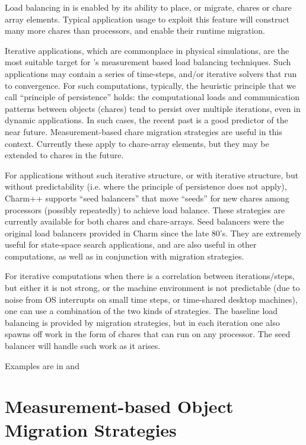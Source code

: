 Load balancing in \charmpp{} is enabled by its ability to place, or
migrate, chares or chare array elements.  Typical application usage to
exploit this feature will construct many more chares than processors, and
enable their runtime migration.

Iterative applications, which are commonplace in physical simulations,
are the most suitable target for \charmpp{}'s measurement based load
balancing techniques.  Such applications may contain a series of
time-steps, and/or iterative solvers that run to convergence. For such
computations, typically, the heuristic principle that we call
``principle of persistence'' holds: the computational loads and
communication patterns between objects (chares) tend to persist over
multiple iterations, even in dynamic applications. In such cases,
the recent past is a good predictor of the near future. Measurement-based
chare migration strategies are useful in this context. Currently these
apply to chare-array elements, but they may be extended to chares in
the future.

For applications without such iterative structure, or with iterative
structure, but without predictability (i.e. where the principle of
persistence does not apply), Charm++ supports ``seed balancers'' that
move ``seeds'' for new chares among processors (possibly repeatedly)
to achieve load balance. These strategies are currently available for
both chares and chare-arrays.  Seed balancers were the original load
balancers provided in Charm since the late 80's. They are extremely
useful for state-space search applications, and are also useful in
other computations, as well as in conjunction with migration
strategies.

For iterative computations when there is a correlation between iterations/steps,
but either it is not strong, or the machine environment is not predictable
(due to noise from OS interrupts on small time steps, or time-shared desktop
machines), one can use a combination of the two kinds of strategies. The
baseline load balancing is provided by migration strategies, but in each
iteration one also spawns off work in the form of chares that can run on any
processor. The seed balancer will handle such work as it arises.

Examples are in  and

\section{Measurement-based Object Migration Strategies}
\label{lbFramework}
\label{migrationlb}

